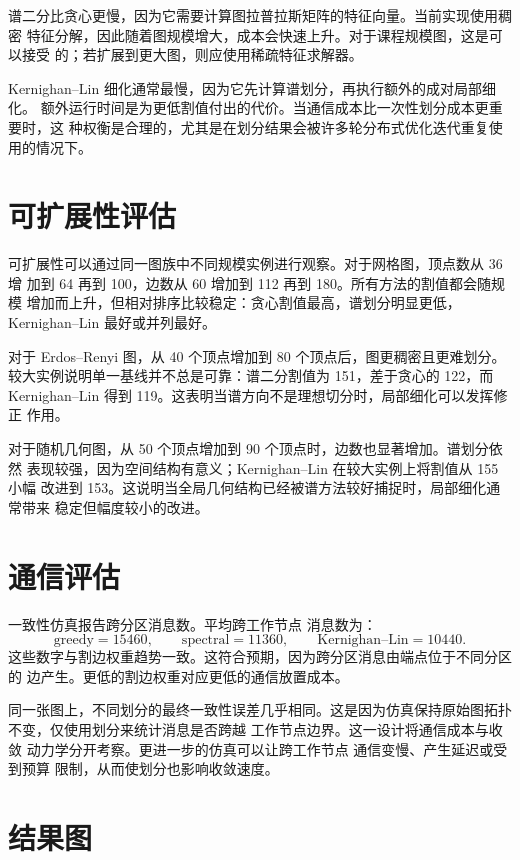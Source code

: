 \documentclass[UTF8, 11pt]{ctexart}
\begin{document}
谱二分比贪心更慢，因为它需要计算图拉普拉斯矩阵的特征向量。当前实现使用稠密
特征分解，因此随着图规模增大，成本会快速上升。对于课程规模图，这是可以接受
的；若扩展到更大图，则应使用稀疏特征求解器。

Kernighan--Lin 细化通常最慢，因为它先计算谱划分，再执行额外的成对局部细化。
额外运行时间是为更低割值付出的代价。当通信成本比一次性划分成本更重要时，这
种权衡是合理的，尤其是在划分结果会被许多轮分布式优化迭代重复使用的情况下。

\section{可扩展性评估}

可扩展性可以通过同一图族中不同规模实例进行观察。对于网格图，顶点数从 36 增
加到 64 再到 100，边数从 60 增加到 112 再到 180。所有方法的割值都会随规模
增加而上升，但相对排序比较稳定：贪心割值最高，谱划分明显更低，
Kernighan--Lin 最好或并列最好。

对于 Erdos--Renyi 图，从 40 个顶点增加到 80 个顶点后，图更稠密且更难划分。
较大实例说明单一基线并不总是可靠：谱二分割值为 151，差于贪心的 122，而
Kernighan--Lin 得到 119。这表明当谱方向不是理想切分时，局部细化可以发挥修正
作用。

对于随机几何图，从 50 个顶点增加到 90 个顶点时，边数也显著增加。谱划分依然
表现较强，因为空间结构有意义；Kernighan--Lin 在较大实例上将割值从 155 小幅
改进到 153。这说明当全局几何结构已经被谱方法较好捕捉时，局部细化通常带来
稳定但幅度较小的改进。

\section{通信评估}

一致性仿真报告跨分区消息数。平均跨工作节点 消息数为：
\[
    \text{greedy}=15460,\qquad
    \text{spectral}=11360,\qquad
    \text{Kernighan--Lin}=10440.
\]
这些数字与割边权重趋势一致。这符合预期，因为跨分区消息由端点位于不同分区的
边产生。更低的割边权重对应更低的通信放置成本。

同一张图上，不同划分的最终一致性误差几乎相同。这是因为仿真保持原始图拓扑
不变，仅使用划分来统计消息是否跨越 工作节点边界。这一设计将通信成本与收敛
动力学分开考察。更进一步的仿真可以让跨工作节点 通信变慢、产生延迟或受到预算
限制，从而使划分也影响收敛速度。

\section{结果图}
\end{document}
